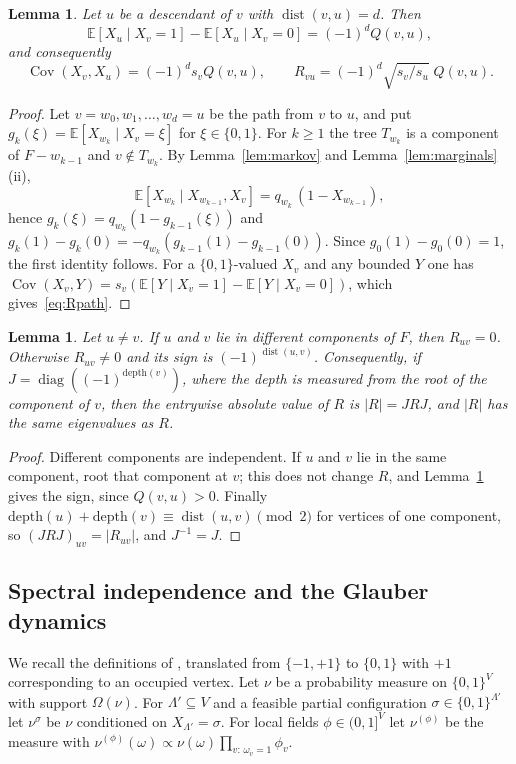 \documentclass{amsart}
\numberwithin{equation}{section}
\numberwithin{table}{section}
\newtheorem{lemma}[theorem]{Lemma}
\theoremstyle{definition}
\theoremstyle{remark}
\newcommand{\E}{\mathbb{E}}
\newcommand{\Cov}{\operatorname{Cov}}
\newcommand{\dist}{\operatorname{dist}}
\newcommand{\diag}{\operatorname{diag}}
\begin{document}
\begin{lemma}\label{lem:paths}
Let $u$ be a descendant of $v$ with $\dist(v,u)=d$. Then
\[
\E[X_u\mid X_v=1]-\E[X_u\mid X_v=0]=(-1)^dQ(v,u),
\]
and consequently
\begin{equation}\label{eq:Rpath}
\Cov(X_v,X_u)=(-1)^d s_vQ(v,u),\qquad R_{vu}=(-1)^d\sqrt{s_v/s_u}\;Q(v,u).
\end{equation}
\end{lemma}

\begin{proof}
Let $v=w_0,w_1,\dots,w_d=u$ be the path from $v$ to $u$, and put $g_k(\xi)=\E[X_{w_k}\mid X_v=\xi]$ for $\xi\in\{0,1\}$. For $k\ge1$ the tree $T_{w_k}$ is a component of $F-w_{k-1}$ and $v\notin T_{w_k}$. By Lemma~\ref{lem:markov} and Lemma~\ref{lem:marginals}(ii),
\[
\E[X_{w_k}\mid X_{w_{k-1}},X_v]=q_{w_k}\,(1-X_{w_{k-1}}),
\]
hence $g_k(\xi)=q_{w_k}(1-g_{k-1}(\xi))$ and $g_k(1)-g_k(0)=-q_{w_k}(g_{k-1}(1)-g_{k-1}(0))$. Since $g_0(1)-g_0(0)=1$, the first identity follows. For a $\{0,1\}$-valued $X_v$ and any bounded $Y$ one has $\Cov(X_v,Y)=s_v(\E[Y\mid X_v=1]-\E[Y\mid X_v=0])$, which gives~\eqref{eq:Rpath}.
\end{proof}

\begin{lemma}\label{lem:sign}
Let $u\ne v$. If $u$ and $v$ lie in different components of $F$, then $R_{uv}=0$. Otherwise $R_{uv}\ne0$ and its sign is $(-1)^{\dist(u,v)}$. Consequently, if $J=\diag((-1)^{\mathrm{depth}(v)})$, where the depth is measured from the root of the component of $v$, then the entrywise absolute value of $R$ is $|R|=JRJ$, and $|R|$ has the same eigenvalues as $R$.
\end{lemma}

\begin{proof}
Different components are independent. If $u$ and $v$ lie in the same component, root that component at $v$; this does not change $R$, and Lemma~\ref{lem:paths} gives the sign, since $Q(v,u)>0$. Finally $\mathrm{depth}(u)+\mathrm{depth}(v)\equiv\dist(u,v)\pmod 2$ for vertices of one component, so $(JRJ)_{uv}=|R_{uv}|$, and $J^{-1}=J$.
\end{proof}

\subsection{Spectral independence and the Glauber dynamics}
We recall the definitions of \cite[Section~1.2]{CFYZ}, translated from $\{-1,+1\}$ to $\{0,1\}$ with $+1$ corresponding to an occupied vertex. Let $\nu$ be a probability measure on $\{0,1\}^V$ with support $\Omega(\nu)$. For $\Lambda'\subseteq V$ and a feasible partial configuration $\sigma\in\{0,1\}^{\Lambda'}$ let $\nu^\sigma$ be $\nu$ conditioned on $X_{\Lambda'}=\sigma$. For local fields $\phi\in(0,1]^V$ let $\nu^{(\phi)}$ be the measure with $\nu^{(\phi)}(\omega)\propto\nu(\omega)\prod_{v:\,\omega_v=1}\phi_v$.
\end{document}
